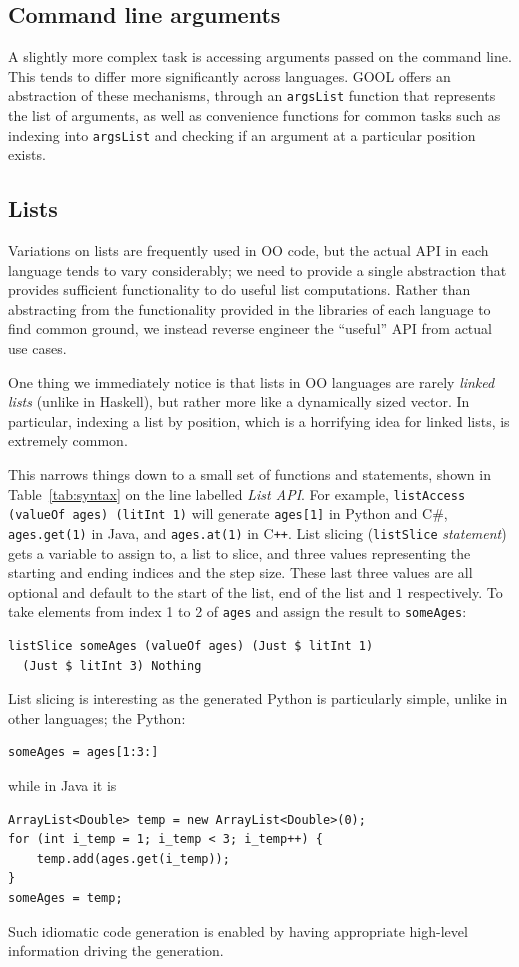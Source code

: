 \documentclass[sigplan,review,prologue,dvipsnames]{acmart}
\newcommand{\Csharp}{C\#}
\newcommand{\Cplusplus}{C\texttt{++}}
\begin{document}
\subsection{Command line arguments}

A slightly more complex task is accessing arguments passed on the command
line. This tends to differ more significantly across languages. GOOL
offers an abstraction of these mechanisms, through an \verb|argsList| function
that represents the list of arguments, as well as convenience functions for
common tasks such as indexing into \verb|argsList| and checking if an argument
at a particular position exists. 

\subsection{Lists}

Variations on lists are frequently used in OO code, but the actual API
in each language tends to vary considerably; we need to provide a single
abstraction that provides sufficient functionality to do useful list
computations.  Rather than abstracting from the functionality provided
in the libraries of each language to find common ground, we instead
reverse engineer the ``useful'' API from actual use cases.  

One thing we immediately notice is that lists in
OO languages are rarely \emph{linked lists} (unlike in Haskell), but rather 
more like a dynamically sized vector. In particular, 
indexing a list by position, which is a horrifying idea for linked lists,
is extremely common.

This narrows things down to a small set of functions and statements, shown in 
Table~\ref{tab:syntax} on the line labelled \emph{List API}.
For example, \verb|listAccess (valueOf ages) (litInt 1)| will 
generate
\verb|ages[1]| in Python and \Csharp, \verb|ages.get(1)| in Java, and
\verb|ages.at(1)| in \Cplusplus.  List slicing (\verb|listSlice|
\emph{statement}) gets a variable to assign to, a list to slice, and three
values representing the starting and ending indices and the step size. These
last three values are all optional and default to the start of the list, end of
the list and $1$ respectively.  To take elements from index 1 to 2 of
\verb|ages| and assign the result to \verb|someAges|:
\begin{lstlisting}
listSlice someAges (valueOf ages) (Just $ litInt 1) 
  (Just $ litInt 3) Nothing
\end{lstlisting}
List slicing is interesting as the generated Python is particularly
simple, unlike in other languages; the Python:
\begin{lstlisting}
someAges = ages[1:3:]
\end{lstlisting}
while in Java it is
\begin{lstlisting}
ArrayList<Double> temp = new ArrayList<Double>(0);
for (int i_temp = 1; i_temp < 3; i_temp++) {
    temp.add(ages.get(i_temp));
}
someAges = temp;
\end{lstlisting}
Such idiomatic code generation is enabled by having
appropriate high-level information driving the generation.
\end{document}

